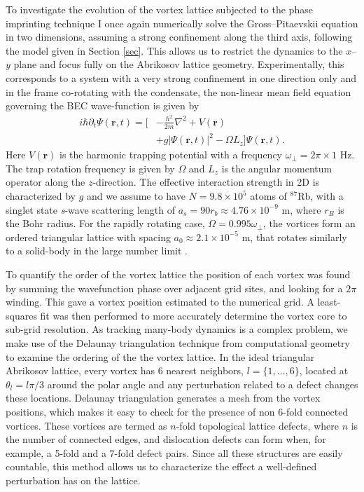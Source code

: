 To investigate the evolution of the vortex lattice subjected to the phase imprinting technique I once again numerically solve the Gross--Pitaevskii equation in two dimensions, assuming a strong confinement along the third axis, following the model given in Section \ref{sec}. This allows us to restrict the dynamics to the $x$--$y$ plane and focus fully on the Abrikosov lattice geometry. Experimentally, this corresponds to a system with a very strong confinement in one direction only \cite{BEC:Stock_lpl_2004,BEC:Seo_jkps_2014,BEC:Chomaz_natcom_2015} and in the frame co-rotating with the condensate, the non-linear mean field equation governing the BEC wave-function is given by
\begin{align}
	i\hbar\partial_t \Psi(\mathbf{r},t) = \Big[&-\frac{\hbar^2}{2m}\nabla^2 + V\left(\mathbf{r}\right) \nonumber\\
	&+ g\vert \Psi(\mathbf{r},t) \vert^2- \Omega L_z \Big]\Psi(\mathbf{r},t).
\end{align}
Here $V\left(\mathbf{r}\right)$ is the harmonic trapping potential with a frequency $\omega_\perp=2\pi\times1$ Hz. The trap rotation frequency is given by $\Omega$ and $L_z$ is the angular momentum operator along the $z$-direction. The effective interaction strength in 2D is characterized by $g$ and we assume to have $N=9.8\times 10^5$ atoms of $^{87}$Rb, with a singlet state \textit{s}-wave scattering length of $a_s = 90r_b \approx 4.76\times 10^{-9}$ m, where $r_B$ is the Bohr radius. For the rapidly rotating case, $\Omega=0.995\omega_\perp$, the vortices form an ordered triangular lattice with spacing $a_0 \approx 2.1\times 10^{-5}$ m, that rotates similarly to a solid-body in the large number limit \cite{BEC:Fetter_rmp_2009}.




To quantify the order of the vortex lattice the position of each vortex was found by summing the wavefunction phase over adjacent grid sites, and looking for a $2\pi$ winding. This gave a vortex position estimated to the numerical grid. A least-squares fit was then performed to more accurately determine the vortex core to sub-grid resolution. As tracking many-body dynamics is a complex problem, we make use of the Delaunay triangulation technique from computational geometry to examine the ordering of the the vortex lattice. In the ideal triangular Abrikosov lattice, every vortex has 6 nearest neighbors, $l=\{1,\ldots,6\}$, located at $\theta_l=l\pi/3$ around the polar angle and any perturbation related to a defect changes these locations. Delaunay triangulation generates a mesh from the vortex positions, which makes it easy to check for the presence of non 6-fold connected vortices. These vortices are termed as $n$-fold topological lattice defects, where $n$ is the number of connected edges, and dislocation defects can form when, for example, a 5-fold and a 7-fold defect pairs. Since all these structures are easily countable, this method allows us to characterize the effect a well-defined perturbation has on the lattice.

